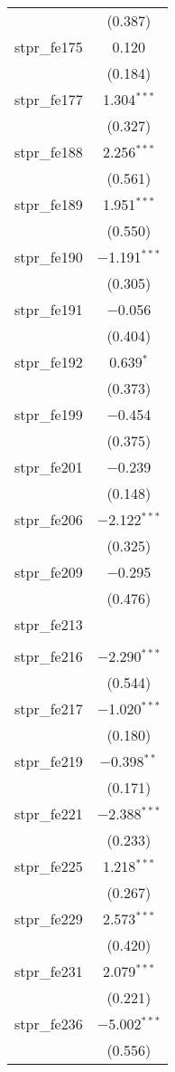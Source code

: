 \begin{table}[!htbp]
\begin{tabular}{@{\extracolsep{5pt}}lc}
  & (0.387) \\ 
  stpr\_fe175 & 0.120 \\ 
  & (0.184) \\ 
  stpr\_fe177 & 1.304$^{***}$ \\ 
  & (0.327) \\ 
  stpr\_fe188 & 2.256$^{***}$ \\ 
  & (0.561) \\ 
  stpr\_fe189 & 1.951$^{***}$ \\ 
  & (0.550) \\ 
  stpr\_fe190 & $-$1.191$^{***}$ \\ 
  & (0.305) \\ 
  stpr\_fe191 & $-$0.056 \\ 
  & (0.404) \\ 
  stpr\_fe192 & 0.639$^{*}$ \\ 
  & (0.373) \\ 
  stpr\_fe199 & $-$0.454 \\ 
  & (0.375) \\ 
  stpr\_fe201 & $-$0.239 \\ 
  & (0.148) \\ 
  stpr\_fe206 & $-$2.122$^{***}$ \\ 
  & (0.325) \\ 
  stpr\_fe209 & $-$0.295 \\ 
  & (0.476) \\ 
  stpr\_fe213 &  \\ 
  &  \\ 
  stpr\_fe216 & $-$2.290$^{***}$ \\ 
  & (0.544) \\ 
  stpr\_fe217 & $-$1.020$^{***}$ \\ 
  & (0.180) \\ 
  stpr\_fe219 & $-$0.398$^{**}$ \\ 
  & (0.171) \\ 
  stpr\_fe221 & $-$2.388$^{***}$ \\ 
  & (0.233) \\ 
  stpr\_fe225 & 1.218$^{***}$ \\ 
  & (0.267) \\ 
  stpr\_fe229 & 2.573$^{***}$ \\ 
  & (0.420) \\ 
  stpr\_fe231 & 2.079$^{***}$ \\ 
  & (0.221) \\ 
  stpr\_fe236 & $-$5.002$^{***}$ \\ 
  & (0.556) \\ 

\end{tabular}
\end{table}
